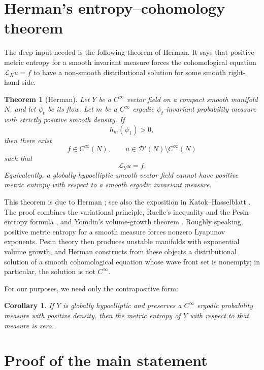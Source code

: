 \documentclass[11pt]{article}
\newtheorem{theorem}{Theorem}
\newtheorem{corollary}{Corollary}
\theoremstyle{definition}
\theoremstyle{remark}
\numberwithin{equation}{section}
\begin{document}
\section{Herman's entropy--cohomology theorem}

The deep input needed is the following theorem of Herman. It says that positive
metric entropy for a smooth invariant measure forces the cohomological equation
\(\mathcal L_Xu=f\) to have a non-smooth distributional solution for some smooth
right-hand side.

\begin{theorem}[Herman]\label{thm:herman}
Let \(Y\) be a \(C^\infty\) vector field on a compact smooth manifold \(N\), and
let \(\psi_t\) be its flow. Let \(m\) be a \(C^\infty\) ergodic
\(\psi_t\)-invariant probability measure with strictly positive smooth density.
If
\[
  h_m(\psi_1)>0,
\]
then there exist
\[
  f\in C^\infty(N), \qquad u\in\mathcal D'(N)\setminus C^\infty(N)
\]
such that
\[
  \mathcal L_Yu=f.
\]
Equivalently, a globally hypoelliptic smooth vector field cannot have positive
metric entropy with respect to a smooth ergodic invariant measure.
\end{theorem}

This theorem is due to Herman \cite{herman}; see also the exposition in
Katok--Hasselblatt \cite{kh}. The proof combines the variational principle,
Ruelle's inequality and the Pesin entropy formula
\cite{katok,pesinweb}, and Yomdin's volume-growth theorem \cite{yomdin}.
Roughly speaking, positive metric entropy for a smooth measure forces nonzero
Lyapunov exponents. Pesin theory then produces unstable manifolds with
exponential volume growth, and Herman constructs from these objects a
distributional solution of a smooth cohomological equation whose wave front set
is nonempty; in particular, the solution is not \(C^\infty\).

For our purposes, we need only the contrapositive form:

\begin{corollary}\label{cor:herman-gh}
If \(Y\) is globally hypoelliptic and preserves a \(C^\infty\) ergodic
probability measure with positive density, then the metric entropy of \(Y\) with
respect to that measure is zero.
\end{corollary}

\section{Proof of the main statement}
\end{document}
